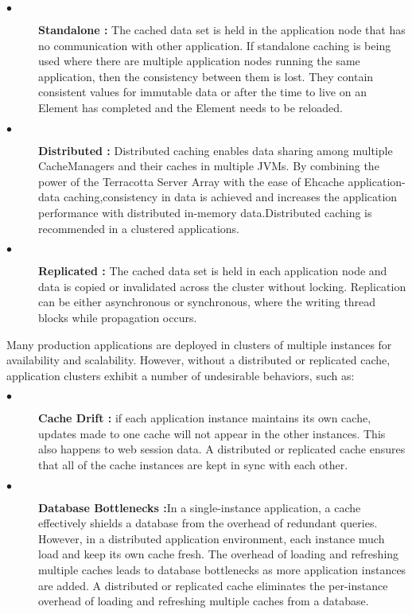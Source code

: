 \begin{description}
	\item[$\bullet$] {\bfseries Standalone :} The cached data set is held in the application node that has no communication with other application. If standalone caching is being used where there are multiple application nodes running the same application, then the consistency between them is lost. They contain consistent values for immutable data or after the time to live on an Element has completed and the Element needs to be reloaded. 
	\item[$\bullet$] {\bfseries Distributed :}  Distributed caching enables data sharing among multiple CacheManagers and their caches in multiple JVMs. By combining the power of the Terracotta Server Array with the ease of Ehcache application-data caching,consistency in data is achieved and increases the application performance with distributed in-memory data.Distributed caching is recommended in a clustered applications.
	\item[$\bullet$] {\bfseries Replicated :} The cached data set is held in each application node and data is copied or invalidated across the cluster without locking. Replication can be either asynchronous or synchronous, where the writing thread blocks while propagation occurs. 
\end{description}				

	
	Many production applications are deployed in clusters of multiple instances for availability and scalability. However, without a distributed or replicated cache, application clusters exhibit a number of undesirable behaviors, such as:
	
\begin{description}
	\item[$\bullet$] {\bfseries Cache Drift :} if each application instance maintains its own cache, updates made to one cache will not appear in the other instances. This also happens to web session data. A distributed or replicated cache ensures that all of the cache instances are kept in sync with each other.
	\item[$\bullet$] {\bfseries Database Bottlenecks :}In a single-instance application, a cache effectively shields a database from the overhead of redundant queries. However, in a distributed application environment, each instance much load and keep its own cache fresh. The overhead of loading and refreshing multiple caches leads to database bottlenecks as more application instances are added. A distributed or replicated cache eliminates the per-instance overhead of loading and refreshing multiple caches from a database.
\end{description}		






